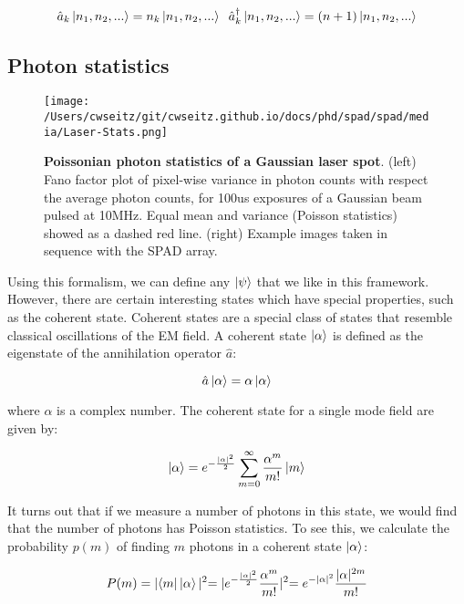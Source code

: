 \begin{equation*}
\hat{a}_k \ket{n_1, n_2, ...} = n_k \ket{n_1, n_2, ...} \;\;
\hat{a}_k^\dagger \ket{n_1, n_2, ...} = (n+1) \ket{n_1, n_2, ...}
\end{equation*}

\subsection{Photon statistics}

\begin{figure*}[t]
\centering
\texttt{[image: /Users/cwseitz/git/cwseitz.github.io/docs/phd/spad/spad/media/Laser-Stats.png]}
\caption{\textbf{Poissonian photon statistics of a Gaussian laser spot}. (left) Fano factor plot of pixel-wise variance in photon counts with respect the average photon counts, for 100us exposures of a Gaussian beam pulsed at 10MHz. Equal mean and variance (Poisson statistics) showed as a dashed red line. (right) Example images taken in sequence with the SPAD array.}
\label{fig:fig30}
\end{figure*}    

Using this formalism, we can define any $\ket{\psi}$ that we like in this framework. However, there are certain interesting states which have special properties, such as the coherent state. Coherent states are a special class of states that resemble classical oscillations of the EM field. A coherent state $\ket{\alpha}$ is defined as the eigenstate of the annihilation operator $\hat{a}$:

\begin{equation*}
\hat{a} \ket{\alpha} = \alpha \ket{\alpha}
\end{equation*}

where $\alpha$ is a complex number. The coherent state for a single mode field are given by:

\begin{equation*}
\ket{\alpha} = e^{-\frac{\lvert\alpha\lvert^2}{2}} \sum_{m=0}^\infty \frac{\alpha^m}{m!} \ket{m}
\end{equation*}

It turns out that if we measure a number of photons in this state, we would find that the number of photons has Poisson statistics. To see this, we calculate the probability $p(m)$ of finding $m$ photons in a coherent state $\ket{\alpha}$:

\begin{equation*}
P(m) = \lvert \bra{m} \ket{\alpha} \lvert^2 = \lvert e^{-\frac{\lvert\alpha\lvert^2}{2}} \frac{\alpha^m}{m!} \lvert^2 = e^{-\lvert\alpha\lvert^2} \frac{\lvert\alpha\lvert^{2m}}{m!}
\end{equation*}


